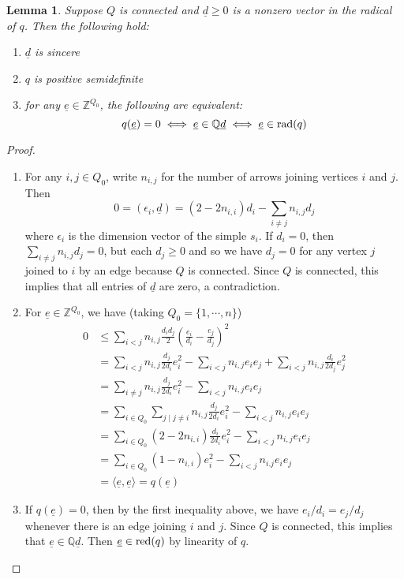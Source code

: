 \documentclass{book}
\newtheorem{lemma}[theorem]{Lemma}
\begin{document}
\begin{lemma}
Suppose $Q$ is connected and $\underline{d}\geq 0$ is a nonzero vector in the radical of $q$. Then the following hold:
\begin{enumerate}
\item $\underline{d}$ is sincere

\item $q$ is positive semidefinite

\item for any $\underline{e}\in \mathbb{Z}^{Q_0}$, the following are equivalent:
$$
q(\underline{e})=0 \iff \underline{e}\in \mathbb{Q}\underline{d} \iff \underline{e}\in \textnormal{rad}(q)
$$
\end{enumerate}
\end{lemma}

\begin{proof}
\begin{enumerate}
\item For any $i,j \in Q_0$, write $n_{i,j}$ for the number of arrows joining vertices $i$ and $j$. Then
$$
0=(\epsilon_i, \underline{d})=(2-2n_{i,i})d_i-\sum_{i\neq j} n_{i,j}d_j
$$
where $\epsilon_i$ is the dimension vector of the simple $s_i$. If $d_i=0$, then $\sum_{i\neq j}n_{i,j}d_j=0$, but each $d_j\geq 0$ and so we have $d_j=0$ for any vertex $j$ joined to $i$ by an edge because $Q$ is connected. Since $Q$ is connected, this implies that all entries of $\underline{d}$ are zero, a contradiction.

\item For $\underline{e}\in \mathbb{Z}^{Q_0}$, we have (taking $Q_0=\{1, \cdots ,n \}$)
\begin{align*}
0 & \leq \sum_{i<j} n_{i,j} \frac{d_id_j}{2}\left(\frac{e_i}{d_i}-\frac{e_j}{d_j}\right)^2\\
& = \sum_{i<j} n_{i,j}\frac{d_j}{2d_i}e_i^2-\sum_{i<j}n_{i,j}e_ie_j+\sum_{i<j}n_{i,j}\frac{d_i}{2d_j}e_j^2\\
& = \sum_{i\neq j} n_{i,j} \frac{d_j}{2d_i}e_i^2-\sum_{i<j}n_{i,j}e_ie_j\\
& = \sum_{i\in Q_0} \sum_{j \mid j\neq i} n_{i,j}\frac{d_j}{2d_i}e_i^2-\sum_{i<j}n_{i,j}e_ie_j\\
& = \sum_{i\in Q_0}(2-2n_{i,i})\frac{d_i}{2d_i}e_i^2-\sum_{i<j}n_{i,j}e_ie_j\\
& = \sum_{i\in Q_0}(1-n_{i,i})e_i^2-\sum_{i<j}n_{i.j}e_ie_j\\
& = \langle \underline{e}, \underline{e}\rangle = q(\underline{e})
\end{align*}

\item If $q(\underline{e})=0$, then by the first inequality above, we have $e_i/d_i=e_j/d_j$ whenever there is an edge joining $i$ and $j$. Since $Q$ is connected, this implies that $\underline{e}\in \mathbb{Q}\underline{d}$. Then $\underline{e}\in \textnormal{red}(q)$ by linearity of $q$.
\end{enumerate}
\end{proof}
\end{document}
